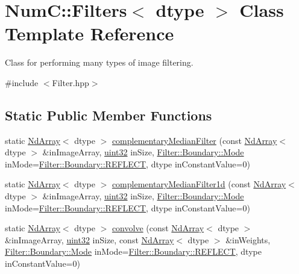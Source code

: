 \hypertarget{class_num_c_1_1_filters}{}\section{NumC\+:\+:Filters$<$ dtype $>$ Class Template Reference}
\label{class_num_c_1_1_filters}


Class for performing many types of image filtering.  




{\ttfamily \#include $<$Filter.\+hpp$>$}

\subsection*{Static Public Member Functions}
\begin{DoxyCompactItemize}
\item 
static \mbox{\hyperlink{class_num_c_1_1_nd_array}{Nd\+Array}}$<$ dtype $>$ \mbox{\hyperlink{class_num_c_1_1_filters_ac64c322e09321ba9903d4463174c1f80}{complementary\+Median\+Filter}} (const \mbox{\hyperlink{class_num_c_1_1_nd_array}{Nd\+Array}}$<$ dtype $>$ \&in\+Image\+Array, \mbox{\hyperlink{namespace_num_c_ae685802ca6d3035f2b400b081e3953fa}{uint32}} in\+Size, \mbox{\hyperlink{struct_num_c_1_1_filter_1_1_boundary_a20ccfbf059139a99eda623c1550a27e3}{Filter\+::\+Boundary\+::\+Mode}} in\+Mode=\mbox{\hyperlink{struct_num_c_1_1_filter_1_1_boundary_a20ccfbf059139a99eda623c1550a27e3a5571d98046aa858b5c79dce8c4c16c04}{Filter\+::\+Boundary\+::\+R\+E\+F\+L\+E\+CT}}, dtype in\+Constant\+Value=0)
\item 
static \mbox{\hyperlink{class_num_c_1_1_nd_array}{Nd\+Array}}$<$ dtype $>$ \mbox{\hyperlink{class_num_c_1_1_filters_a2d0e5efdec107524f4de3cf4cf3bb210}{complementary\+Median\+Filter1d}} (const \mbox{\hyperlink{class_num_c_1_1_nd_array}{Nd\+Array}}$<$ dtype $>$ \&in\+Image\+Array, \mbox{\hyperlink{namespace_num_c_ae685802ca6d3035f2b400b081e3953fa}{uint32}} in\+Size, \mbox{\hyperlink{struct_num_c_1_1_filter_1_1_boundary_a20ccfbf059139a99eda623c1550a27e3}{Filter\+::\+Boundary\+::\+Mode}} in\+Mode=\mbox{\hyperlink{struct_num_c_1_1_filter_1_1_boundary_a20ccfbf059139a99eda623c1550a27e3a5571d98046aa858b5c79dce8c4c16c04}{Filter\+::\+Boundary\+::\+R\+E\+F\+L\+E\+CT}}, dtype in\+Constant\+Value=0)
\item 
static \mbox{\hyperlink{class_num_c_1_1_nd_array}{Nd\+Array}}$<$ dtype $>$ \mbox{\hyperlink{class_num_c_1_1_filters_ac748e9ed1f97917ba619ef0978b85d95}{convolve}} (const \mbox{\hyperlink{class_num_c_1_1_nd_array}{Nd\+Array}}$<$ dtype $>$ \&in\+Image\+Array, \mbox{\hyperlink{namespace_num_c_ae685802ca6d3035f2b400b081e3953fa}{uint32}} in\+Size, const \mbox{\hyperlink{class_num_c_1_1_nd_array}{Nd\+Array}}$<$ dtype $>$ \&in\+Weights, \mbox{\hyperlink{struct_num_c_1_1_filter_1_1_boundary_a20ccfbf059139a99eda623c1550a27e3}{Filter\+::\+Boundary\+::\+Mode}} in\+Mode=\mbox{\hyperlink{struct_num_c_1_1_filter_1_1_boundary_a20ccfbf059139a99eda623c1550a27e3a5571d98046aa858b5c79dce8c4c16c04}{Filter\+::\+Boundary\+::\+R\+E\+F\+L\+E\+CT}}, dtype in\+Constant\+Value=0)

\end{DoxyCompactItemize}

